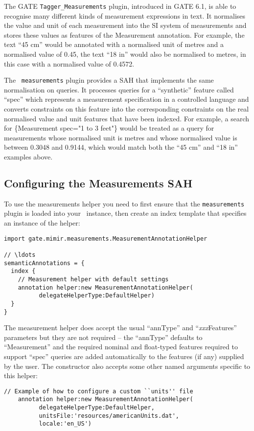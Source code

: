 The GATE {\tt Tagger\_Measurements} plugin, introduced in GATE 6.1, is able to
recognise many different kinds of measurement expressions in text.  It
normalises the value and unit of each measurement into the SI system of
measurements and stores these values as features of the Measurement annotation.
For example, the text ``45 cm'' would be annotated with a normalised unit of
metres and a normalised value of 0.45, the text ``18 in'' would also be
normalised to metres, in this case with a normalised value of 0.4572.

The \Mimir\ {\tt measurements} plugin provides a SAH that implements the same
normalisation on queries.  It processes queries for a ``synthetic'' feature
called ``spec'' which represents a measurement specification in a controlled
language and converts constraints on this feature into the corresponding
constraints on the real normalised value and unit features that have been
indexed.  For example, a search for \{Measurement spec="1 to 3 feet"\} would be
treated as a query for measurements whose normalised unit is metres and whose
normalised value is between 0.3048 and 0.9144, which would match both the ``45
cm'' and ``18 in'' examples above.

\subsection{Configuring the Measurements SAH}

To use the measurements helper you need to first ensure that the
{\tt measurements} plugin is loaded into your \Mimir\ instance, then create an
index template that specifies an instance of the helper:
\begin{lstlisting}[texcl]
import gate.mimir.measurements.MeasurementAnnotationHelper

// \ldots
semanticAnnotations = {
  index {
    // Measurement helper with default settings
    annotation helper:new MeasurementAnnotationHelper(
          delegateHelperType:DefaultHelper)
  }
}
\end{lstlisting}

The measurement helper does accept the usual ``annType'' and
``{\em xxx}Features'' parameters but they are not required -- the ``annType''
defaults to ``Measurement'' and the required nominal and float-typed features
required to support ``spec'' queries are added automatically to the features
(if any) supplied by the user.  The constructor also accepts some
other named arguments specific to this helper:
\begin{lstlisting}[firstnumber=6,texcl]
    // Example of how to configure a custom ``units'' file
    annotation helper:new MeasurementAnnotationHelper(
          delegateHelperType:DefaultHelper,
          unitsFile:'resources/americanUnits.dat',
          locale:'en_US')
\end{lstlisting}

